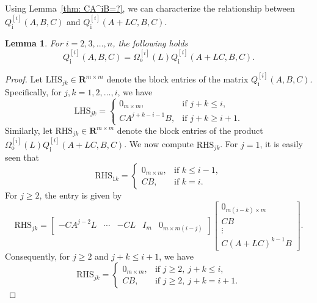 \documentclass[sort&compress]{elsarticle}
\newtheorem{lemma}{Lemma}
\newcommand\Pio{\mathit\Omega_\mathrm o}
\newcommand\Qi{Q_\mathrm i}
\newcommand\R{\mathbf R}
\begin{document}
Using Lemma~\ref{thm: CA^iB=?}, we can characterize the relationship
between $\Qi^{[i]}(A,B,C)$ and $\Qi^{[i]}(A+LC,B,C)$.

\begin{lemma}
\label{thm: Qi(A,B,C)=Pio(A,C,L)*Qi(A+LC,B,C)}
For $i=2,3,\dots,n$, the following holds
\[
\Qi^{[i]}(A,B,C) = \Pio^{[i]}(L)\Qi^{[i]}(A+LC,B,C).
\]
\end{lemma}

\begin{proof}
Let $\mathrm{LHS}_{jk} \in \R^{m\times m}$ denote the block entries of the matrix $\Qi^{[i]}(A,B,C)$.
Specifically, for $j,k=1,2,\dots,i$, we have
\begin{equation}\label{eqn: LHS=what}
\mathrm{LHS}_{jk}=
\begin{cases}
0_{m\times m}, & \text{if } j+k \le i,\\
CA^{j+k-i-1}B, & \text{if } j+k \ge i+1.
\end{cases}
\end{equation}
Similarly, let $\mathrm{RHS}_{jk} \in \R^{m\times m}$ denote the block entries of the product
$\Pio^{[i]}(L)\Qi^{[i]}(A+LC,B,C)$.
We now compute $\mathrm{RHS}_{jk}$.
For $j=1$, it is easily seen that
\begin{equation}\label{eqn: RHSjk=? 1}
\mathrm{RHS}_{1k} = \begin{cases}
0_{m\times m}, & \text{if } k \le i-1,\\
CB, & \text{if } k=i.
\end{cases}
\end{equation}
For $j \ge 2$, the entry is given by
\begin{equation}\label{eqn: RHSjk=what*what}
\mathrm{RHS}_{jk} =
\begin{bmatrix}
-CA^{j-2}L & \cdots & -CL & I_m & 0_{m\times m(i-j)}
\end{bmatrix}
\begin{bmatrix}
0_{m(i-k)\times m} \\ CB \\ \vdots \\ C(A+LC)^{k-1}B
\end{bmatrix}.
\end{equation}
Consequently, for $j \ge 2$ and $j+k \le i+1$, we have
\begin{equation}\label{eqn: RHSjk=? 2}
\mathrm{RHS}_{jk} =
\begin{cases}
0_{m\times m}, & \text{if } j \ge 2, \ j+k \le i,\\
CB, & \text{if } j \ge 2, \ j+k = i+1.
\end{cases}

\end{equation}
\end{proof}
\end{document}
